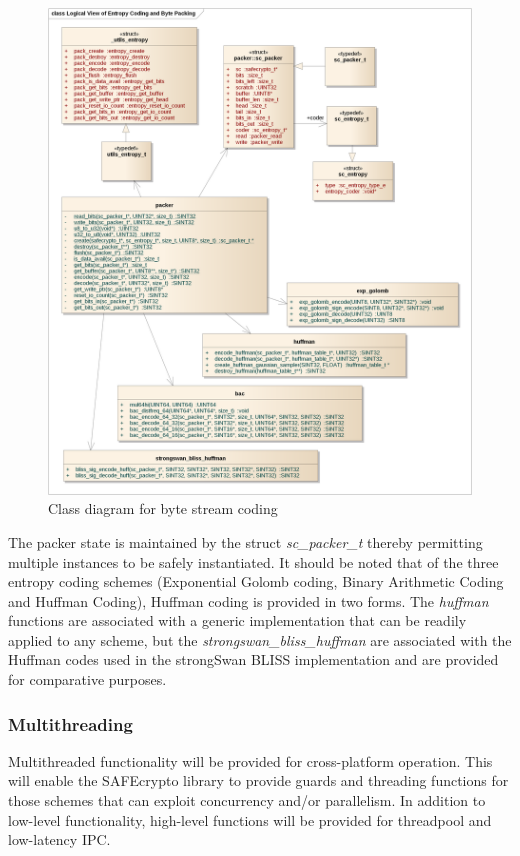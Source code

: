 \begin{figure}[!h]
\centering
\includegraphics[width=\textwidth]{libsafecrypto_packer_logical_view.png}
\caption{Class diagram for byte stream coding}
\label{fig:safecrypto_coding}
\end{figure}

\newpage
The packer state is maintained by the struct \textit{sc\_packer\_t} thereby permitting multiple instances to be safely instantiated. It should be noted that of the three entropy coding schemes (Exponential Golomb coding, Binary Arithmetic Coding and Huffman Coding), Huffman coding is provided in two forms. The \textit{huffman} functions are associated with a generic implementation that can be readily applied to any scheme, but the \textit{strongswan\_bliss\_huffman} are associated with the Huffman codes used in the strongSwan BLISS implementation and are provided for comparative purposes.


\newpage
\subsubsection{Multithreading}

Multithreaded functionality will be provided for cross-platform operation. This will enable the SAFEcrypto library to provide guards and threading functions for those schemes that can exploit concurrency and/or parallelism. In addition to low-level functionality, high-level functions will be provided for threadpool and low-latency IPC.

